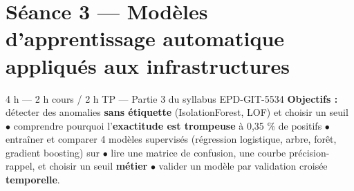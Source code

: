 \section{Séance 3 --- Modèles d'apprentissage automatique appliqués aux infrastructures}
{4 h --- 2 h cours / 2 h TP --- Partie 3 du syllabus EPD-GIT-5534}
{\textbf{Objectifs :} détecter des anomalies \textbf{sans étiquette}
(IsolationForest, LOF) et choisir un seuil $\bullet$ comprendre pourquoi
l'\textbf{exactitude est trompeuse} à 0,35 \% de positifs $\bullet$ entraîner
et comparer 4 modèles supervisés (régression logistique, arbre, forêt,
gradient boosting) sur  $\bullet$ lire une matrice
de confusion, une courbe précision-rappel, et choisir un seuil \textbf{métier}
$\bullet$ valider un modèle par validation croisée \textbf{temporelle}.}

